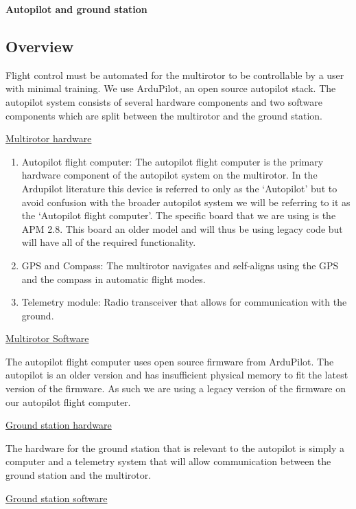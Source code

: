 \textbf{Autopilot and ground station}

\subsection{Overview}

Flight control must be automated for the multirotor to be controllable by a user with minimal training. We use ArduPilot, an open source autopilot stack. The autopilot system consists of several hardware components and two software components which are split between the multirotor and the ground station.

\underline{Multirotor hardware}\

\begin{enumerate}

    \item Autopilot flight computer: The autopilot flight computer is the primary hardware component of the autopilot system on the multirotor. In the Ardupilot literature this device is referred to only as the ‘Autopilot’ but to avoid confusion with the broader autopilot system we will be referring to it as the ‘Autopilot flight computer’. The specific board that we are using is the APM 2.8. This board an older model and will thus be using legacy code but will have all of the required functionality.
  
  \item GPS and Compass: The multirotor navigates and self-aligns using the GPS and the compass in automatic flight modes.
 
 \item Telemetry module: Radio transceiver that allows for communication with the ground.
 
\end{enumerate}

\underline{Multirotor Software}

The autopilot flight computer uses open source firmware from ArduPilot. The autopilot is an older version and has insufficient physical memory to fit the latest version of the firmware. As such we are using a legacy version of the firmware on our autopilot flight computer.

\underline{Ground station hardware}

The hardware for the ground station that is relevant to the autopilot is simply a computer and a telemetry system that will allow communication between the ground station and the multirotor.

\underline{Ground station software}

